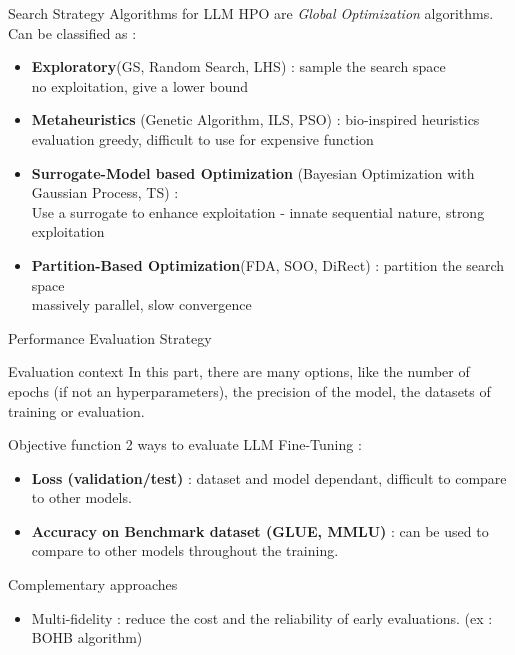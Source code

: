 \begin{frame}{Search Strategy}
    Algorithms for LLM HPO are \textit{Global Optimization} algorithms. Can be classified as : 

    \begin{itemize}
        \item \textbf{Exploratory}(GS, Random Search, LHS) : sample the search space\\ \quad no exploitation, give a lower bound
        \item \textbf{Metaheuristics} (Genetic Algorithm, ILS, PSO) : bio-inspired heuristics \\ \quad evaluation greedy, difficult to use for expensive function
        \item \textbf{Surrogate-Model based Optimization} (Bayesian Optimization with Gaussian Process, TS) : \\ \quad Use a surrogate to enhance exploitation - innate sequential nature, strong exploitation
        \item \textbf{Partition-Based Optimization}(FDA, SOO, DiRect) : partition the search space \\ \quad massively parallel, slow convergence
    \end{itemize}


\end{frame}


\begin{frame}{Performance Evaluation Strategy}
    \begin{block}{Evaluation context}
    In this part, there are many options, like the number of epochs (if not an hyperparameters), the precision of the model, the datasets of training or evaluation. 
        
    \end{block}
    \begin{block}{Objective function}
        2 ways to evaluate LLM Fine-Tuning : 
        \begin{itemize}
            \item \textbf{Loss (validation/test)} : dataset and model dependant, difficult to compare to other models.
            \item \textbf{Accuracy on Benchmark dataset (GLUE, MMLU)} : can be used to compare to other models throughout the training. 
        \end{itemize}
    \end{block}

    \begin{block}{Complementary approaches}
        \begin{itemize}
            \item Multi-fidelity : reduce the cost and the reliability of early evaluations. (ex : BOHB algorithm)
        \end{itemize}
        
    \end{block}
    
\end{frame}